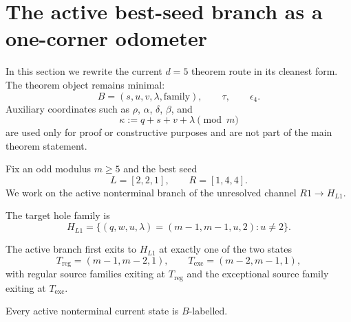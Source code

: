 \section{The active best-seed branch as a one-corner odometer}

In this section we rewrite the current $d=5$ theorem route in its cleanest
form. The theorem object remains minimal:
\[
B=(s,u,v,\lambda,\mathrm{family}),\qquad \tau,\qquad \epsilon_4.
\]
Auxiliary coordinates such as $\rho$, $\alpha$, $\delta$, $\beta$, and
\[
\kappa:=q+s+v+\lambda \pmod m
\]
are used only for proof or constructive purposes and are not part of the main
theorem statement.

Fix an odd modulus $m\ge 5$ and the best seed
\[
L=[2,2,1],\qquad R=[1,4,4].
\]
We work on the active nonterminal branch of the unresolved channel
$R1\to H_{L1}$.

\begin{proposition}
The target hole family is
\[
H_{L1}=\{(q,w,u,\lambda)=(m-1,m-1,u,2):u\neq 2\}.
\]
\end{proposition}

\begin{proposition}
The active branch first exits to $H_{L1}$ at exactly one of the two states
\[
T_{\mathrm{reg}}=(m-1,m-2,1),
\qquad
T_{\mathrm{exc}}=(m-2,m-1,1),
\]
with regular source families exiting at $T_{\mathrm{reg}}$ and the exceptional
source family exiting at $T_{\mathrm{exc}}$.
\end{proposition}

\begin{proposition}
Every active nonterminal current state is $B$-labelled.
\end{proposition}

